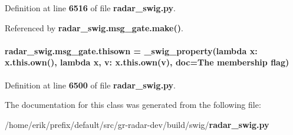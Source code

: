 Definition at line {\bf 6516} of file {\bf radar\+\_\+swig.\+py}.



Referenced by {\bf radar\+\_\+swig.\+msg\+\_\+gate.\+make()}.

\paragraph[{thisown}]{\setlength{\rightskip}{0pt plus 5cm}radar\+\_\+swig.\+msg\+\_\+gate.\+thisown = {\bf \+\_\+swig\+\_\+property}(lambda x\+: x.\+this.\+own(), lambda {\bf x}, v\+: x.\+this.\+own(v), doc=\textquotesingle{}The membership flag\textquotesingle{})\hspace{0.3cm}{\ttfamily [static]}}\label{classradar__swig_1_1msg__gate_aef5a896a7df75e0b29eceab3c6d99a6b}


Definition at line {\bf 6500} of file {\bf radar\+\_\+swig.\+py}.



The documentation for this class was generated from the following file\+:\begin{DoxyCompactItemize}
\item 
/home/erik/prefix/default/src/gr-\/radar-\/dev/build/swig/{\bf radar\+\_\+swig.\+py}\end{DoxyCompactItemize}
